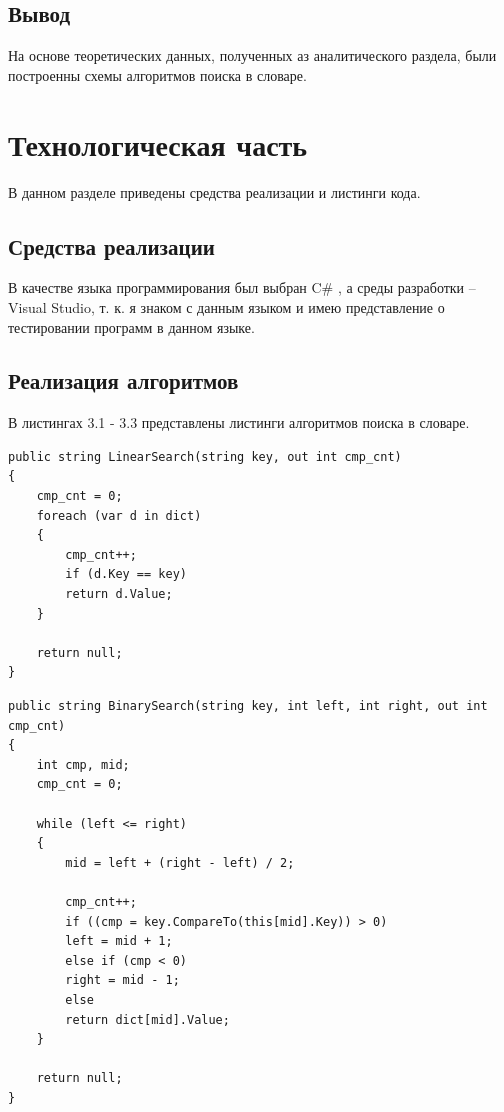 \documentclass[12pt]{report}
\begin{document}
\section*{Вывод}

На основе теоретических данных, полученных аз аналитического раздела, были построенны схемы алгоритмов поиска в словаре.

\chapter{Технологическая часть}

В данном разделе приведены средства реализации и листинги кода.

\section{Средства реализации}

В качестве языка программирования был выбран C\# \cite{Microsoft}, а среды разработки -- Visual Studio\cite{VS}, т. к. я знаком с данным языком и имею представление о тестировании программ в данном языке.

\section{Реализация алгоритмов}

В листингах 3.1 - 3.3 представлены листинги алгоритмов поиска в словаре.

\captionsetup{singlelinecheck = false, justification=raggedright}
\begin{lstlisting}[label=some-code,caption=Алгоритм полного перебора]
public string LinearSearch(string key, out int cmp_cnt)
{
	cmp_cnt = 0;
	foreach (var d in dict)
	{
		cmp_cnt++;
		if (d.Key == key)
		return d.Value;
	}
	
	return null;
}
\end{lstlisting}

\newpage
\begin{lstlisting}[label=some-code,caption=Алгоритм двоичного поиска]
public string BinarySearch(string key, int left, int right, out int cmp_cnt)
{
	int cmp, mid;
	cmp_cnt = 0;
	
	while (left <= right)
	{
		mid = left + (right - left) / 2;
		
		cmp_cnt++;
		if ((cmp = key.CompareTo(this[mid].Key)) > 0)
		left = mid + 1;
		else if (cmp < 0)
		right = mid - 1;
		else
		return dict[mid].Value;
	}
	
	return null;
}
\end{lstlisting}
\end{document}
